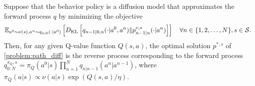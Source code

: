\begin{theorem}
\label{thm:optim_is_reverse_process}
    Suppose that the behavior policy is a diffusion model that approximates the forward process $q$ by minimizing the objective
    \begin{equation}
    \label{eq:diffusion_elbo}
        \mathbb{E}_{a^0\sim \nu(s), a^n\sim q_{n|0}(\cdot|a^0)}\left[D_{\rm KL}\left[q_{n-1|0,n}(\cdot|a^0,a^n)\|p^{\nu,s}_{n-1|n}(\cdot|a^n)\right]\right] \quad \forall n\in\{1, 2, \ldots, N\}, s\in\mathcal{S}.
    \end{equation}
    Then, for any given Q-value function $Q(s, a)$, the optimal solution $p^{*,s}$ of \eqref{problem:path_diff} is the reverse process corresponding to the forward process $q^{\pi_Q,s}_{0:N}=\pi_Q(a^0|s)\prod_{n=1}^Nq_{n|n-1}(a^n|a^{n-1})$, where $\pi_Q(a|s)\propto\nu(a|s)\exp(Q(s,a)/\eta)$.
\end{theorem}
